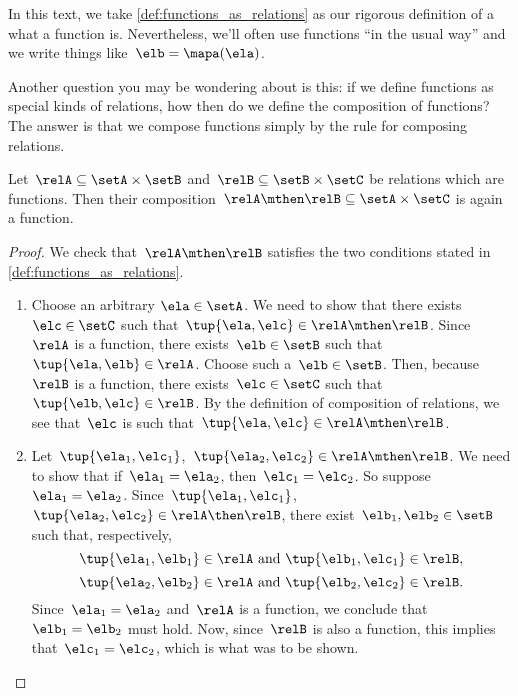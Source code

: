 In this text, we take \cref{def:functions_as_relations} as our rigorous definition of a what a function is. Nevertheless, we'll often use functions ``in the usual way'' and we write things like~$\elb = \mapa(\ela)$.

Another question you may be wondering about is this: if we define functions as special kinds of relations, how then do we define the composition of functions? The answer is that we compose functions simply by the rule for composing relations.

\begin{lemma}
  \label{lem:comprelfun}
  Let~$\relA \subseteq \setA \times \setB$ and~$\relB \subseteq \setB \times \setC$ be relations which are functions. Then their composition~$\relA \mthen \relB \subseteq \setA \times \setC$ is again a function.
\end{lemma}

\begin{proof}
  We check that~$\relA \mthen \relB$ satisfies the two conditions stated in \cref{def:functions_as_relations}.

  \begin{enumerate}
    \item Choose an arbitrary $\ela \in \setA$. We need to show that there exists~$\elc \in \setC$ such that~$\tup{\ela,\elc} \in \relA \mthen \relB$. Since~$\relA$ is a function, there exists~$\elb \in \setB$ such that~$\tup{\ela,\elb} \in \relA$. Choose such a~$\elb \in \setB$. Then, because~$\relB$ is a function, there exists~$\elc \in \setC$ such that~$\tup{\elb,\elc} \in \relB$. By the definition of composition of relations, we see that~$\elc$ is such that~$\tup{\ela,\elc} \in \relA \mthen \relB$.
    \item Let~$\tup{\ela_1, \elc_1}$,~$\tup{\ela_2,\elc_2} \in \relA \mthen \relB$. We need to show that if~$\ela_1 = \ela_2$, then~$\elc_1 = \elc_2$. So suppose~$\ela_1 = \ela_2$. Since~$\tup{\ela_1, \elc_1}$,~$\tup{\ela_2,\elc_2} \in \relA \then \relB$, there exist~$\elb_1, \elb_2 \in \setB$ such that, respectively,
    \begin{equation*}
      \tup{\ela_1, \elb_1} \in \relA \text{ and } \tup{\elb_1, \elc_1} \in \relB,
    \end{equation*}
    \begin{equation*}
      \tup{\ela_2, \elb_2} \in \relA \text{ and } \tup{\elb_2, \elc_2} \in \relB.
    \end{equation*}
    Since~$\ela_1 = \ela_2$ and~$\relA$ is a function, we conclude that~$\elb_1 = \elb_2$ must hold. Now, since~$\relB$ is also a function, this implies that~$\elc_1 = \elc_2$, which is what was to be shown.
  \end{enumerate}
\end{proof}


